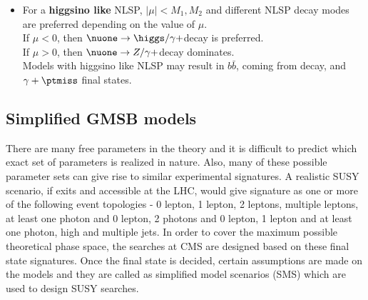 \begin{itemize}
\item For a \textbf{higgsino like} NLSP, $|\mu| < M_1,M_2$ and different NLSP decay modes are preferred depending on the value of $\mu$.\\
If $\mu < 0$, then $\nuone \rightarrow \higgs/\gamma + $\grav decay is preferred.\\
If $\mu > 0$, then $\nuone \rightarrow Z/\gamma + $\grav decay dominates.\\
Models with higgsino like NLSP may result in $b\bar{b}$, coming from \higgs decay, and $\gamma+\ptmiss$ final states.
\end{itemize}

\subsection{Simplified GMSB models}\label{sec:SMSgmsb}
There are many free parameters in the theory and it is difficult to predict which exact set of parameters is realized in nature. Also, 
many of these possible parameter sets can give rise to similar experimental signatures. 
A realistic SUSY scenario, if exits and accessible at the LHC, would give signature as one or more of the following event topologies - 
0 lepton, 1 lepton, 2 leptons, multiple leptons, at least one photon and 0 lepton, 2 photons and 0 lepton, 1 lepton 
and at least one photon, high \ptmiss and multiple jets.
In order to cover the maximum possible theoretical phase space, the searches at CMS are designed based on these final state signatures. Once the final state is decided, certain
assumptions are made on the models and they are called as simplified model scenarios (SMS) 
\cite{bib-sms-1,bib-sms-2,bib-sms-3,bib-sms-4,Chatrchyan:2013sza} which are used to design SUSY searches.

